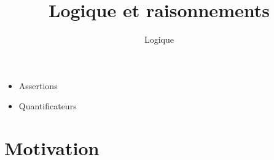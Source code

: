 



\title{{\bf Logique et raisonnements}}
\subtitle{Logique}
\author{}

\date{}




\begin{frame}
  
  \debutmontitre

  \pause

{\footnotesize
\hfill
{}
\begin{minipage}{0.6\textwidth}
  \begin{itemize}
    \item<3-> Assertions
    \item<4-> Quantificateurs
  \end{itemize}
\end{minipage}
}

\end{frame}

\setcounter{framenumber}{0}




\section{Motivation}

